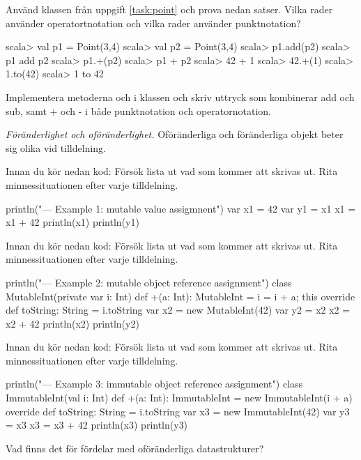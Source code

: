 \Subtask Använd klassen  från uppgift \ref{task:point} och prova nedan satser. Vilka rader använder operatortnotation och vilka rader använder punktnotation?
\begin{REPL}
scala> val p1 = Point(3,4)
scala> val p2 = Point(3,4)
scala> p1.add(p2)
scala> p1 add p2
scala> p1.+(p2)
scala> p1 + p2
scala> 42 + 1
scala> 42.+(1)
scala> 1.to(42)
scala> 1 to 42
\end{REPL}

\Subtask Implementera metoderna  och \code{-} i klassen  och skriv uttryck som kombinerar add och sub, samt + och - i både punktnotation och operatornotation.



\Task \emph{Föränderlighet och oföränderlighet.} Oföränderliga och föränderliga objekt beter sig olika vid tilldelning.  

\Subtask\Pen Innan du kör nedan kod: Försök lista ut vad som kommer att skrivas ut. Rita minnessituationen efter varje tilldelning. 

\begin{Code}
println("\n--- Example 1: mutable value assigmnent")
var x1 = 42
var y1 = x1
x1 = x1 + 42
println(x1)
println(y1)
\end{Code}

\Subtask\Pen Innan du kör nedan kod: Försök lista ut vad som kommer att skrivas ut. Rita minnessituationen efter varje tilldelning.

\begin{Code}
println("\n--- Example 2: mutable object reference assignment")
class MutableInt(private var i: Int) {
  def +(a: Int): MutableInt = { i = i + a; this }
  override def toString: String = i.toString
}
var x2 = new MutableInt(42)
var y2 = x2
x2 = x2 + 42
println(x2)
println(y2)
\end{Code}

\Subtask\Pen Innan du kör nedan kod: Försök lista ut vad som kommer att skrivas ut. Rita minnessituationen efter varje tilldelning.

\begin{Code}
println("\n--- Example 3: immutable object reference assignment")
class ImmutableInt(val i: Int) {
  def +(a: Int): ImmutableInt = new ImmutableInt(i + a) 
  override def toString: String = i.toString
}
var x3 = new ImmutableInt(42)
var y3 = x3
x3 = x3 + 42
println(x3)
println(y3)
\end{Code}

\Subtask\Pen Vad finns det för fördelar med oföränderliga datastrukturer?


